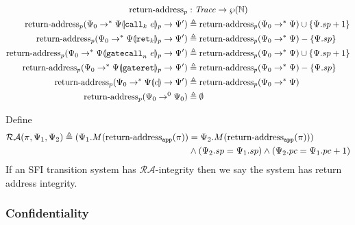 \begin{center}
  \begin{align*}
    \operatorname{return-address}_p & : \mathit{Trace} \rightarrow \wp({\mathbb{N}})
    \\
    \operatorname{return-address}_p(\Psi_0 \mathrel{\mathrel{\rightarrow}^{\ast}} {\Psi}\llparenthesis{\ensuremath{\mathtt{call}}_{{k}}\ {e}}\rrparenthesis_{p} \mathrel{\rightarrow} \Psi') & \triangleq \operatorname{return-address}_p(\Psi_0 \mathrel{\mathrel{\rightarrow}^{\ast}} \Psi) \cup \{\Psi.sp + 1\}
    \\
    \operatorname{return-address}_p(\Psi_0 \mathrel{\mathrel{\rightarrow}^{\ast}} {\Psi}\llparenthesis{\ensuremath{\mathtt{ret}_{{k}}}}\rrparenthesis_{p} \mathrel{\rightarrow} \Psi') & \triangleq \operatorname{return-address}_p(\Psi_0 \mathrel{\mathrel{\rightarrow}^{\ast}} \Psi) - \{\Psi.sp\}
    \\
    \operatorname{return-address}_p(\Psi_0 \mathrel{\mathrel{\rightarrow}^{\ast}} {\Psi}\llparenthesis{\ensuremath{\mathtt{gatecall}_{n}\ {e}}}\rrparenthesis_{p} \mathrel{\rightarrow} \Psi') & \triangleq \operatorname{return-address}_p(\Psi_0 \mathrel{\mathrel{\rightarrow}^{\ast}} \Psi) \cup \{\Psi.sp + 1\}
    \\
    \operatorname{return-address}_p(\Psi_0 \mathrel{\mathrel{\rightarrow}^{\ast}} {\Psi}\llparenthesis{\ensuremath{\mathtt{gateret}}}\rrparenthesis_{p} \mathrel{\rightarrow} \Psi') & \triangleq \operatorname{return-address}_p(\Psi_0 \mathrel{\mathrel{\rightarrow}^{\ast}} \Psi) - \{\Psi.sp\}
    \\
    \operatorname{return-address}_p(\Psi_0 \mathrel{\mathrel{\rightarrow}^{\ast}} {\Psi}\llparenthesis{c}\rrparenthesis \mathrel{\rightarrow} \Psi') & \triangleq \operatorname{return-address}_p(\Psi_0 \mathrel{\mathrel{\rightarrow}^{\ast}} \Psi)
    \\
    \operatorname{return-address}_p(\Psi_0 \mathrel{\mathrel{\rightarrow}^{0}} \Psi_0) & \triangleq \emptyset
  \end{align*}
  \label{fig:appendix:return-address}
\end{center}

\begin{definition}
  Define
  \begin{align*}
    \mathcal{RA}(\pi, \Psi_1, \Psi_2) \triangleq (\Psi_1.M(\operatorname{return-address}_{\mathtt{app}}(\pi)) &= \Psi_2.M(\operatorname{return-address}_{\mathtt{app}}(\pi))) \\
    & {}\wedge (\Psi_2.sp = \Psi_1.sp)  \wedge (\Psi_2.pc = \Psi_1.pc + 1)
  \end{align*} 
  \[
  \]
  If an SFI transition system has $\mathcal{RA}$-integrity then we say the system has return address integrity.
\end{definition}

\subsubsection{Confidentiality}
\label{sec:appendix:confidentiality}

